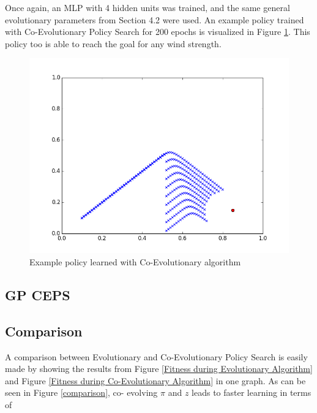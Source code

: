 Once again, an MLP with 4 hidden units was trained, and the same general evolutionary parameters from Section 4.2 were used. An example policy trained with Co-Evolutionary Policy Search for 200 epochs is visualized in Figure \ref{Example policy learned with Co-Evolutionary algorithm}. This policy too is able to reach the goal for any wind strength.


\begin{figure}[ht]
  \centering
  \includegraphics[scale=0.5]{images/co_evo_result.png}
  \caption{Example policy learned with Co-Evolutionary algorithm}\label{Example policy learned with Co-Evolutionary algorithm}
\end{figure}

\subsection{GP CEPS}

\subsection{Comparison}

A comparison between Evolutionary and Co-Evolutionary Policy Search is easily made by showing the results from Figure \ref{Fitness during Evolutionary Algorithm} and Figure \ref{Fitness during Co-Evolutionary Algorithm} in one graph. As can be seen in Figure \ref{comparison}, co-
evolving $\pi$ and $z$ leads to faster learning in terms of 

